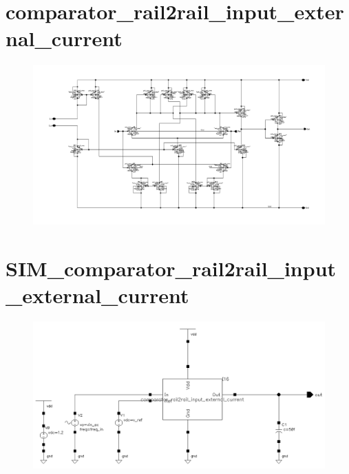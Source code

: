 \documentclass[english, 12pt, a4paper]{ifimaster}
\begin{document}
\begin{appendices}
\section{comparator\_rail2rail\_input\_external\_current}
\begin{figure}[!ht]
 \centering
 \includegraphics[width=20cm, angle=90]{img/comparator_rail2rail_input_external_current_snall_schem}
 \label{app:comparator:rail2rail}
\end{figure}
\newpage
\section{SIM\_comparator\_rail2rail\_input\_external\_current}
\begin{figure}[!ht]
 \centering
 \includegraphics[width=20cm, angle=90]{img/SIM_comparator_rail2rail_input_external_current_small_schem}
 \label{app:SIM:comparator:rail2rail}
\end{figure}

\newpage

\end{appendices}
\end{document}
